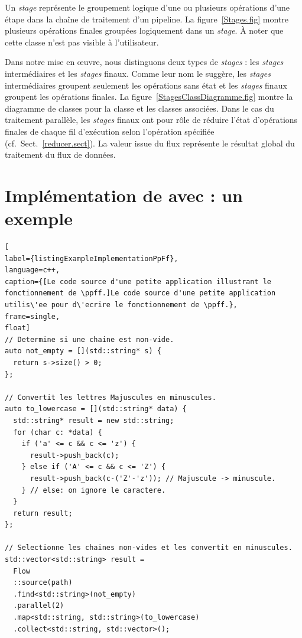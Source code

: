 Un \emph{stage} repr\'esente le groupement logique d'une ou plusieurs op\'erations d'une \'etape dans la cha\^ine de traitement d'un pipeline. La figure~\ref{Stages.fig} montre plusieurs op\'erations finales group\'ees logiquement dans un \emph{stage}.  \`A noter que cette classe n'est pas visible \`a l'utilisateur. 

Dans notre mise en \oe{}uvre, nous distinguons deux types de \emph{stages} : les \emph{stages} interm\'ediaires et les \emph{stages} finaux. Comme leur nom le sugg\`ere, les \emph{stages} interm\'ediaires groupent seulement les op\'erations sans \'etat et les \emph{stages} finaux groupent les op\'erations finales. La figure~\ref{StagesClassDiagramme.fig} montre la diagramme de classes pour la classe  et les classes associ\'ees. Dans le cas du traitement parall\`ele, les \emph{stages} finaux ont pour r\^ole de r\'eduire l'\'etat d'op\'erations finales de chaque fil d'ex\'ecution selon l'op\'eration sp\'ecifi\'ee (cf.~Sect.~\ref{reducer.sect}). La valeur issue du flux repr\'esente le r\'esultat global du traitement du flux de donn\'ees.



\section{Impl\'ementation de  avec  : un exemple}

\begin{lstlisting}[
label={listingExampleImplementationPpFf},
language=c++,
caption={[Le code source d'une petite application illustrant le fonctionnement de \ppff.]Le code source d'une petite application utilis\'ee pour d\'ecrire le fonctionnement de \ppff.},
frame=single,
float]
// Determine si une chaine est non-vide.
auto not_empty = [](std::string* s) {
  return s->size() > 0;
};
	
// Convertit les lettres Majuscules en minuscules.
auto to_lowercase = [](std::string* data) {
  std::string* result = new std::string;
  for (char c: *data) {
    if ('a' <= c && c <= 'z') {
   	  result->push_back(c);
   	} else if ('A' <= c && c <= 'Z') {
	  result->push_back(c-('Z'-'z')); // Majuscule -> minuscule.
   	} // else: on ignore le caractere.
  }
  return result;	
};

// Selectionne les chaines non-vides et les convertit en minuscules.
std::vector<std::string> result = 
  Flow
  ::source(path)
  .find<std::string>(not_empty)
  .parallel(2)
  .map<std::string, std::string>(to_lowercase)
  .collect<std::string, std::vector>();
\end{lstlisting}


